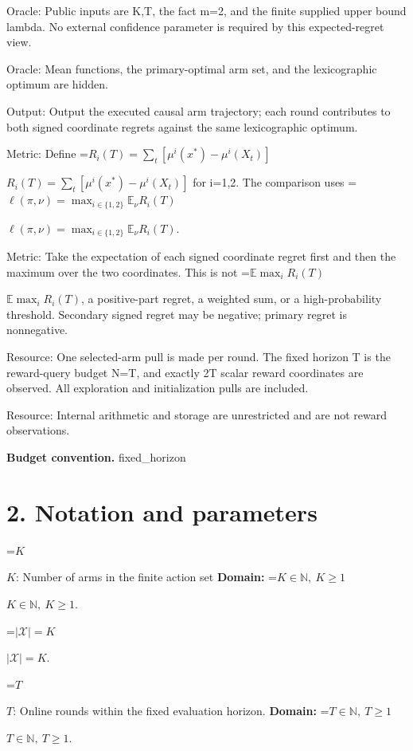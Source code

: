 \documentclass[10pt,a4paper]{article}
\newcommand{\AtlasMath}[1]{\par\begingroup\centering\setbox0=\hbox{$\displaystyle #1$}\ifdim\wd0>1.4\linewidth\typeout{ATLAS WIDE FORMULA: \the\wd0}\fi\ifdim\wd0>\linewidth\resizebox{\linewidth}{!}{\box0}\else\box0\fi\par\endgroup}
\newcommand{\AtlasInlineMath}[1]{\begingroup\setbox0=\hbox{$#1$}\ifdim\wd0>.4\linewidth\endgroup\AtlasMath{#1}\else\endgroup$#1$\fi}
\begin{document}
Oracle: Public inputs are K,T, the fact m=2, and the finite supplied upper bound lambda. No external confidence parameter is required by this expected-regret view.



Oracle: Mean functions, the primary-optimal arm set, and the lexicographic optimum are hidden.



Output: Output the executed causal arm trajectory; each round contributes to both signed coordinate regrets against the same lexicographic optimum.



Metric: Define \AtlasInlineMath{R_i(T)=\sum_t[\mu^i(x^*)-\mu^i(X_t)]} for i=1,2. The comparison uses \AtlasInlineMath{\ell(\pi,\nu)=\max_{i\in\{1,2\}}\mathbb E_\nu R_i(T)}.



Metric: Take the expectation of each signed coordinate regret first and then the maximum over the two coordinates. This is not \AtlasInlineMath{\mathbb E\max_iR_i(T)}, a positive-part regret, a weighted sum, or a high-probability threshold. Secondary signed regret may be negative; primary regret is nonnegative.



Resource: One selected-arm pull is made per round. The fixed horizon T is the reward-query budget N=T, and exactly 2T scalar reward coordinates are observed. All exploration and initialization pulls are included.



Resource: Internal arithmetic and storage are unrestricted and are not reward observations.



\textbf{Budget convention.} fixed\_horizon



\section{2. Notation and parameters}


\AtlasInlineMath{K}: Number of arms in the finite action set \textbf{Domain:} \AtlasInlineMath{K\in\mathbb N,\ K\ge1}.



\AtlasInlineMath{|\mathcal X|=K}.



\AtlasInlineMath{T}: Online rounds within the fixed evaluation horizon. \textbf{Domain:} \AtlasInlineMath{T\in\mathbb N,\ T\ge1}.
\end{document}
